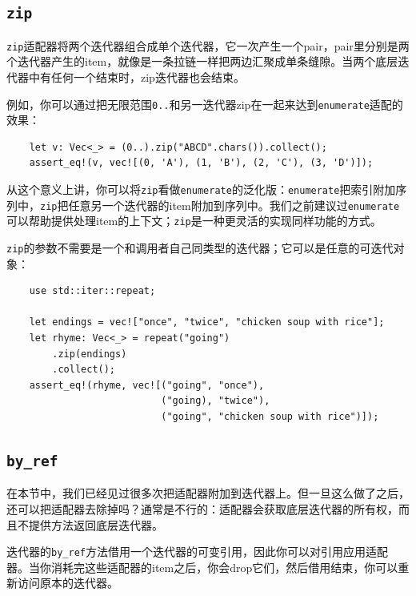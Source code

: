 \subsection{\texttt{zip}}
\texttt{zip}适配器将两个迭代器组合成单个迭代器，它一次产生一个pair，pair里分别是两个迭代器产生的item，就像是一条拉链一样把两边汇聚成单条缝隙。当两个底层迭代器中有任何一个结束时，zip迭代器也会结束。

例如，你可以通过把无限范围\texttt{0..}和另一迭代器zip在一起来达到\texttt{enumerate}适配的效果：
\begin{verbatim}
    let v: Vec<_> = (0..).zip("ABCD".chars()).collect();
    assert_eq!(v, vec![(0, 'A'), (1, 'B'), (2, 'C'), (3, 'D')]);
\end{verbatim}

从这个意义上讲，你可以将\texttt{zip}看做\texttt{enumerate}的泛化版：\texttt{enumerate}把索引附加序列中，\texttt{zip}把任意另一个迭代器的item附加到序列中。我们之前建议过\texttt{enumerate}可以帮助提供处理item的上下文；\texttt{zip}是一种更灵活的实现同样功能的方式。

\texttt{zip}的参数不需要是一个和调用者自己同类型的迭代器；它可以是任意的可迭代对象：
\begin{verbatim}
    use std::iter::repeat;

    let endings = vec!["once", "twice", "chicken soup with rice"];
    let rhyme: Vec<_> = repeat("going")
        .zip(endings)
        .collect();
    assert_eq!(rhyme, vec![("going", "once"),
                           ("going), "twice"),
                           ("going", "chicken soup with rice")]);
\end{verbatim}

\subsection{\texttt{by\_ref}}
在本节中，我们已经见过很多次把适配器附加到迭代器上。但一旦这么做了之后，还可以把适配器去除掉吗？通常是不行的：适配器会获取底层迭代器的所有权，而且不提供方法返回底层迭代器。

迭代器的\texttt{by\_ref}方法借用一个迭代器的可变引用，因此你可以对引用应用适配器。当你消耗完这些适配器的item之后，你会drop它们，然后借用结束，你可以重新访问原本的迭代器。

